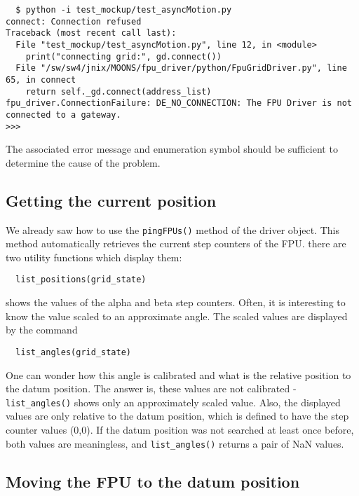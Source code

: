 \documentclass{scrartcl}[12pt,a4paper]
\begin{document}
\begin{verbatim}
  $ python -i test_mockup/test_asyncMotion.py 
connect: Connection refused
Traceback (most recent call last):
  File "test_mockup/test_asyncMotion.py", line 12, in <module>
    print("connecting grid:", gd.connect())
  File "/sw/sw4/jnix/MOONS/fpu_driver/python/FpuGridDriver.py", line 65, in connect
    return self._gd.connect(address_list)
fpu_driver.ConnectionFailure: DE_NO_CONNECTION: The FPU Driver is not connected to a gateway.
>>> 
\end{verbatim}


The associated error message and enumeration symbol should be
sufficient to determine the cause of the problem. 




\subsection{Getting the current position}

We already saw how to use the \texttt{pingFPUs()} method
of the driver object. This method automatically
retrieves the current step counters of the FPU.
there are two utility functions which display them:

\begin{verbatim}
  list_positions(grid_state)
\end{verbatim}

shows the values of the alpha and beta step counters.
Often, it is interesting to know the value scaled
to an approximate angle. The scaled values
are displayed by the command

\begin{verbatim}
  list_angles(grid_state)
\end{verbatim}


One can wonder how this angle is calibrated and what is the relative
position to the datum position. The answer is, these values are not
calibrated - \texttt{list\_angles()} shows only an approximately
scaled value.  Also, the displayed values are only relative to the
datum position, which is defined to have the step counter values
(0,0). If the datum position was not searched at least once before,
both values are meaningless, and \texttt{list\_angles()} returns a
pair of NaN values.




\subsection{Moving the FPU to the datum position}
\end{document}
